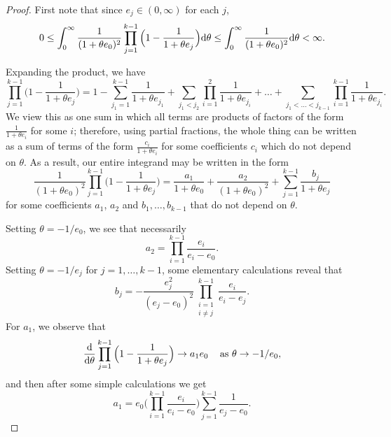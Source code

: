 \documentclass{article}
\theoremstyle{plain}
\theoremstyle{definition}
\renewcommand{\d}{{\rm{d}}}
\begin{document}
\begin{proof}
First note that since $e_j\in(0,\infty)$ for each $j$,
\[0\le \int_0^\infty \frac{1}{(1+\theta e_0)^2} \prod_{j=1}^{k-1} \Big(1-\frac{1}{1+\theta e_j}\Big)\d \theta \le \int_0^\infty \frac{1}{(1+\theta e_0)^2} \d \theta < \infty.\]

Expanding the product, we have 
\[\prod_{j=1}^{k-1} \Big(1-\frac{1}{1+\theta e_j}\Big) = 1 - \sum_{j_1=1}^{k-1}\frac{1}{1+\theta e_{j_1}} + \sum_{j_1<j_2}\prod_{i=1}^2\frac{1}{1+\theta e_{j_i}} + \ldots + \sum_{j_1<\ldots<j_{k-1}}\prod_{i=1}^{k-1}\frac{1}{1+\theta e_{j_i}}.\]
We view this as one sum in which all terms are products of factors of the form $\frac{1}{1+\theta e_i}$ for some $i$; therefore, using partial fractions, the whole thing can be written as a sum of terms of the form $\frac{c_i}{1+\theta e_i}$ for some coefficients $c_i$ which do not depend on $\theta$. As a result, our entire integrand may be written in the form
\begin{equation}\label{infpfrac}
\frac{1}{(1+\theta e_0)^2} \prod_{j=1}^{k-1} \Big(1-\frac{1}{1+\theta e_j}\Big) = \frac{a_1}{1+\theta e_0} + \frac{a_2}{(1+\theta e_0)^2} + \sum_{j=1}^{k-1} \frac{b_j}{1+\theta e_j}
\end{equation}
for some coefficients $a_1$, $a_2$ and $b_1,\ldots,b_{k-1}$ that do not depend on $\theta$.

Setting $\theta=-1/e_0$, we see that necessarily
\[a_2 = \prod_{i=1}^{k-1} \frac{e_i}{e_i-e_0}.\]
Setting $\theta = -1/e_j$ for $j=1,\ldots,k-1$, some elementary calculations reveal that
\[b_j = -\frac{e_j^2}{(e_j-e_0)^2}\prod_{\substack{i=1\\ i\neq j}}^{k-1} \frac{e_i}{e_i-e_j}.\]
For $a_1$, we observe that
\[\frac{\d}{\d\theta} \prod_{j=1}^{k-1} \Big(1-\frac{1}{1+\theta e_j}\Big) \to a_1 e_0 \hspace{3mm} \hbox{ as } \theta \to -1/e_0,\]
and then after some simple calculations we get
\[a_1 = e_0 \bigg(\prod_{i=1}^{k-1} \frac{e_i}{e_i-e_0}\bigg)\sum_{j=1}^{k-1} \frac{1}{e_j-e_0}.\]


\end{proof}
\end{document}
